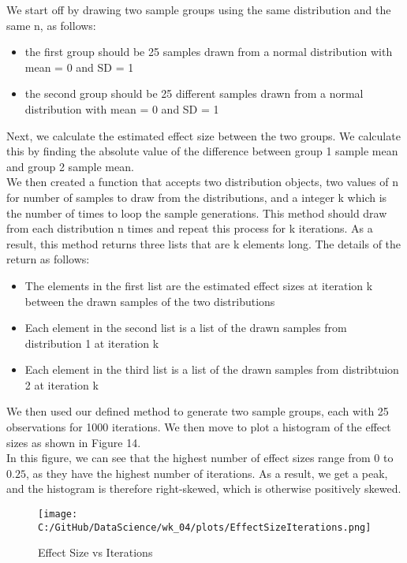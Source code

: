 \documentclass[a4paper,twocolumn]{article}
\begin{document}
We start off by drawing two sample groups using the same distribution and the same n, as follows:
\begin{itemize}
    \item the first group should be 25 samples drawn from a normal distribution with mean = 0 and SD = 1
    \item the second group should be 25 different samples drawn from a normal distribution with mean = 0 and SD = 1
\end{itemize}

Next, we calculate the estimated effect size between the two groups. We calculate this by finding the absolute 
value of the difference between group 1 sample mean and group 2 sample mean. \\

We then created a function that accepts two distribution objects, two values of n for number of samples to draw from 
the distributions, and a integer k which is the number of times to loop the sample generations. This method should 
draw from each distribution n times and repeat this process for k iterations. As a result, this method returns 
three lists that are k elements long. The details of the return as follows:

\begin{itemize}
    \item The elements in the first list are the estimated effect sizes at iteration k between the drawn samples of 
    the two distributions
    \item Each element in the second list is a list of the drawn samples from distribution 1 at iteration k
    \item Each element in the third list is a list of the drawn samples from distribtuion 2 at iteration k
\end{itemize}

We then used our defined method to generate two sample groups, each with 25 observations for 1000 iterations. 
We then move to plot a histogram of the effect sizes as shown in Figure 14. \\ 

In this figure, we can see that the highest number of effect sizes range from 0 to $0.25$, as they have the highest
number of iterations. As a result, we get a peak, and the histogram is therefore right-skewed, which is otherwise 
positively skewed.

\begin{figure}[htbp] 
    \centering
    \noindent
    \texttt{[image: C:/GitHub/DataScience/wk\_04/plots/EffectSizeIterations.png]}
    \caption{Effect Size vs Iterations} 
\end{figure}
\end{document}
